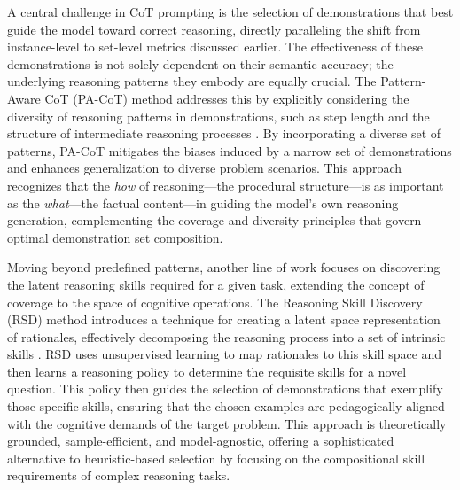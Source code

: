 \documentclass[11pt]{article}
\begin{document}
A central challenge in CoT prompting is the selection of demonstrations that best guide the model toward correct reasoning, directly paralleling the shift from instance-level to set-level metrics discussed earlier. The effectiveness of these demonstrations is not solely dependent on their semantic accuracy; the underlying reasoning patterns they embody are equally crucial. The Pattern-Aware CoT (PA-CoT) method addresses this by explicitly considering the diversity of reasoning patterns in demonstrations, such as step length and the structure of intermediate reasoning processes \cite{ref145}. By incorporating a diverse set of patterns, PA-CoT mitigates the biases induced by a narrow set of demonstrations and enhances generalization to diverse problem scenarios. This approach recognizes that the \emph{how} of reasoning---the procedural structure---is as important as the \emph{what}---the factual content---in guiding the model's own reasoning generation, complementing the coverage and diversity principles that govern optimal demonstration set composition.

Moving beyond predefined patterns, another line of work focuses on discovering the latent reasoning skills required for a given task, extending the concept of coverage to the space of cognitive operations. The Reasoning Skill Discovery (RSD) method introduces a technique for creating a latent space representation of rationales, effectively decomposing the reasoning process into a set of intrinsic skills \cite{ref146}. RSD uses unsupervised learning to map rationales to this skill space and then learns a reasoning policy to determine the requisite skills for a novel question. This policy then guides the selection of demonstrations that exemplify those specific skills, ensuring that the chosen examples are pedagogically aligned with the cognitive demands of the target problem. This approach is theoretically grounded, sample-efficient, and model-agnostic, offering a sophisticated alternative to heuristic-based selection by focusing on the compositional skill requirements of complex reasoning tasks.
\end{document}
